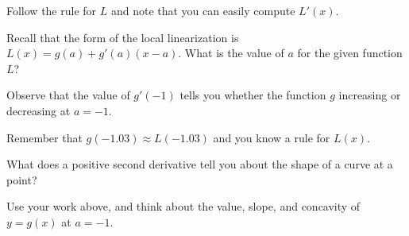 \begin{bighint}
\ba
	\item Follow the rule for $L$ and note that you can easily compute $L'(x)$.
	\item Recall that the form of the local linearization is $L(x) = g(a) + g'(a)(x-a)$.  What is the value of $a$ for the given function $L$?
	\item Observe that the value of $g'(-1)$ tells you whether the function $g$ increasing or decreasing at $a = -1$.
	\item Remember that $g(-1.03) \approx L(-1.03)$ and you know a rule for $L(x)$.
	\item What does a positive second derivative tell you about the shape of a curve at a point?
	\item Use your work above, and think about the value, slope, and concavity of $y = g(x)$ at $a = -1$.
\ea
\end{bighint}




\aftera